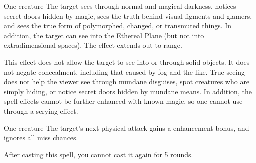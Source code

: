 \begin{spellheader}
    \spelldur{\durshort}
\end{spellheader}
\begin{spelleffects}
    \begin{spelltarget}{One creature}
        \spelleffect The target sees through normal and magical darkness, notices secret doors hidden by magic, sees the truth behind visual figments and glamers, and sees the true form of polymorphed, changed, or transmuted things. In addition, the target can see into the Ethereal Plane (but not into extradimensional spaces). The effect extends out to \rngmed range.
    \end{spelltarget}
\end{spelleffects}
\begin{spellfooter}
    \spellnotes This effect does not allow the target to see into or through solid objects. It does not negate concealment, including that caused by fog and the like. True seeing does not help the viewer see through mundane disguises, spot creatures who are simply hiding, or notice secret doors hidden by mundane means. In addition, the spell effects cannot be further enhanced with known magic, so one cannot use  through a scrying effect.
\end{spellfooter}

\begin{spellheader}
    \spellrng{\rngmed}
\end{spellheader}
\begin{spelleffects}
    \begin{spelltarget}{One creature}
        \spelleffect The target's next physical attack gains a  enhancement bonus, and ignores all miss chances. 
    \end{spelltarget}
\end{spelleffects}
\begin{spellfooter}
    \spellnotes After casting this spell, you cannot cast it again for 5 rounds.
\end{spellfooter}

